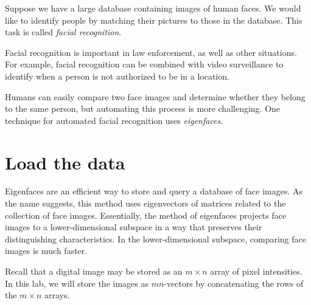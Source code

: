 \label{lab:FacialRecognition}


Suppose we have a large database containing images of human faces.
We would like to identify people by matching their pictures to those in the database.
This task is called \emph{facial recognition}.

Facial recognition is important in law enforcement, as well as other situations. 
For example, facial recognition can be combined with video surveillance to identify when a person is not authorized to be in a location.

Humans can easily compare two face images and determine whether they belong to the same person, but automating this process is more challenging.
One technique for automated facial recognition uses \emph{eigenfaces}.

\section*{Load the data}
Eigenfaces are an efficient way to store and query a database of face images.
As the name suggests, this method uses eigenvectors of matrices related to the collection of face images.
Essentially, the method of eigenfaces projects face images to a lower-dimensional subspace in a way that preserves their distinguishing characteristics. 
In the lower-dimensional subspace, comparing face images is much faster.

Recall that a digital image may be stored as an $m \times n$ array of pixel intensities. 
In this lab, we will store the images as $mn$-vectors by concatenating the rows of the $m \times n$ arrays.


